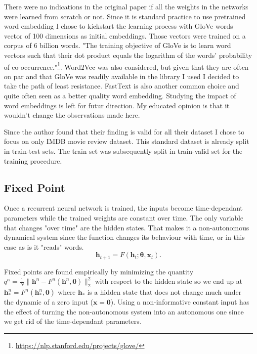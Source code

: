 \documentclass{article}
\begin{document}
There were no indications in the original paper if all the weights in the networks were learned from scratch or not. Since it is standard practice to use pretrained word embedding I chose to kickstart the learning process with GloVe \cite{pennington2014glove} words vector of 100 dimensions as initial embeddings. Those vectors were trained on a corpus of 6 billion words. "The training objective of GloVe is to learn word vectors such that their dot product equals the logarithm of the words' probability of co-occurrence."\footnote{\url{https://nlp.stanford.edu/projects/glove/}}. Word2Vec \cite{mikolov2013efficient} was also considered, but given that they are often on par and that GloVe was readily available in the library I used I decided to take the path of least resistance. FastText \cite{mikolov2018advances} is also another common choice and quite often seen as a better quality word embedding. Studying the impact of word embeddings is left for futur direction. My educated opinion is that it wouldn't change the observations made here.

Since the author found that their finding is valid for all their dataset I chose to focus on only IMDB movie review dataset. This standard dataset is already split in train-test sets. The train set was subsequently split in train-valid set for the training procedure.

\subsection{Fixed Point}
\label{sec:method-fixed_point}
Once a recurrent neural network is trained, the inputs become time-dependant parameters while the trained weights are constant over time. The only variable that changes "over time" are the hidden states. That makes it a non-autonomous dynamical system since the function changes its behaviour with time, or in this case as is it "reads" words.
\[
  \mathbf{h}_{t+1} = F\left(\mathbf{h}_t;\pmb{\theta}, \mathbf{x}_t\right)
.\] 

Fixed points are found empirically by minimizing the quantity $q^{n}=\frac{1}{N}\|\mathbf{h}^{n}-F^{n}(\mathbf{h}^{n}, \mathbf{0})\|_2^2$ with respect to the hidden state so we end up at $\mathbf{h}_{*}^{n}=F^{n}(\mathbf{h}_*^{n}, \mathbf{0})$ where $\mathbf{h}_*$ is a hidden state that does not change much under the dynamic of a zero input ($\mathbf{x}=\mathbf{0}$). Using a non-informative constant input has the effect of turning the non-autonomous system into an autonomous one since we get rid of the time-dependant parameters.
\end{document}
